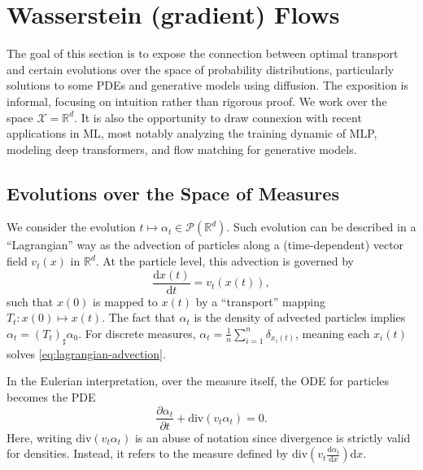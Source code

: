 
\section{Wasserstein (gradient) Flows}

The goal of this section is to expose the connection between optimal transport and certain evolutions over the space of probability distributions, particularly solutions to some PDEs and generative models using diffusion. The exposition is informal, focusing on intuition rather than rigorous proof. We work over the space $\mathcal{X} = \mathbb{R}^d$. It is also the opportunity to draw connexion with recent applications in ML, most notably analyzing the training dynamic of MLP, modeling deep transformers, and flow matching for generative models.

\subsection{Evolutions over the Space of Measures}

We consider the evolution $t \mapsto \alpha_t \in \mathcal{P}(\mathbb{R}^d)$. Such evolution can be described in a ``Lagrangian'' way as the advection of particles along a (time-dependent) vector field $v_t(x)$ in $\mathbb{R}^d$. At the particle level, this advection is governed by 
\begin{equation}
    \frac{\mathrm{d}x(t)}{\mathrm{d}t} = v_t(x(t)), \label{eq:lagrangian-advection}
\end{equation}
such that $x(0)$ is mapped to $x(t)$ by a ``transport'' mapping $T_t : x(0) \mapsto x(t)$. The fact that $\alpha_t$ is the density of advected particles implies $\alpha_t = (T_t)_\sharp \alpha_0$. For discrete measures, $\alpha_t = \frac{1}{n} \sum_{i=1}^n \delta_{x_i(t)}$, meaning each $x_i(t)$ solves \eqref{eq:lagrangian-advection}.

In the Eulerian interpretation, over the measure itself, the ODE for particles becomes the PDE
\begin{equation}
    \frac{\partial \alpha_t}{\partial t} + \mathrm{div}(v_t \alpha_t) = 0. \label{eq:eulerian-advection}
\end{equation}
Here, writing $\mathrm{div}(v_t \alpha_t)$ is an abuse of notation since divergence is strictly valid for densities. Instead, it refers to the measure defined by $\mathrm{div}\left(v_t \frac{\mathrm{d} \alpha_t}{\mathrm{d} x}\right) \mathrm{d}x$.

